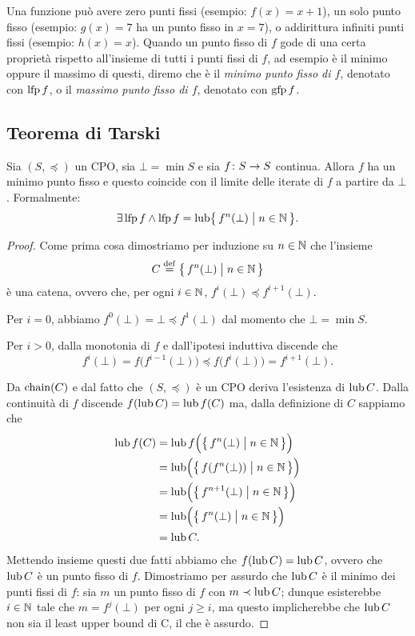 Una funzione può avere zero punti fissi (esempio: $f(x) = x+1$),
un solo punto fisso
(esempio: $g(x) = 7$ ha un punto fisso in $x=7$),
o addirittura infiniti punti fissi (esempio: $h(x) = x$).
Quando un punto fisso di $f$ gode di una certa proprietà rispetto
all'insieme di tutti i punti fissi di $f$, ad esempio è il minimo
oppure il massimo di questi, diremo che è il
\emph{minimo punto fisso di $f$}, denotato con $\mathop{\mathrm{lfp}}\nolimits f$,
o il \emph{massimo punto fisso di $f$}, denotato con $\mathop{\mathrm{gfp}}\nolimits f$.

\subsection{Teorema di Tarski}
\label{sec:Tarski}

\begin{teorema} 
Sia $(S, \preceq)$ un CPO, sia $\bot = \min S$ e sia
$\mathord{f}\colon S\to S$ continua.
Allora $f$ ha un minimo punto fisso e questo coincide con il limite
delle iterate di $f$ a partire da $\bot$.
Formalmente:
\[
  \exists \mathop{\mathrm{lfp}}\nolimits f
    \land
      \mathop{\mathrm{lfp}}\nolimits f = \mathop{\mathrm{lub}}\nolimits \bigl\{\, f^n(\bot) \bigm| n \in \mathbb{N} \,\bigr\}.
\]
\begin{proof}
Come prima cosa dimostriamo per induzione su $n \in \mathbb{N}$
che l'insieme
\[
  C \defeq \bigl\{\, f^n(\bot) \bigm| n \in \Nset \,\bigr\}
\]
è una catena, ovvero che, per ogni $i \in \mathbb{N}$,
$f^i(\bot) \preceq f^{i+1}(\bot)$.

Per $i = 0$, abbiamo $f^0(\bot) = \bot \preceq f^1(\bot)$
dal momento che $\bot = \min S$.

Per $i > 0$, dalla monotonia di $f$ e dall'ipotesi induttiva discende che
\[
  f^i(\bot) = f\bigl(f^{i-1}(\bot)\bigr)
            \preceq f\bigl(f^i(\bot)\bigr)
            = f^{i+1}(\bot).
\]

Da $\mathop{\mathrm{chain}}\nolimits(C)$ e dal fatto che $(S, \preceq)$ è un CPO deriva l'esistenza
di $\mathop{\mathrm{lub}}\nolimits C$.
Dalla continuità di $f$ discende $f(\mathop{\mathrm{lub}}\nolimits C) = \mathop{\mathrm{lub}}\nolimits f(C)$ ma,
dalla definizione di $C$ sappiamo che
\begin{align*}
  \mathop{\mathrm{lub}}\nolimits f(C)
    &= \mathop{\mathrm{lub}}\nolimits f\Bigl(\bigl\{\, f^n(\bot) \bigm| n \in \mathbb{N} \,\bigr\}\Bigr) \\
    &= \mathop{\mathrm{lub}}\nolimits \Bigl(\bigl\{\, f(f^n(\bot)) \bigm| n \in \mathbb{N} \,\bigr\}\Bigr) \\
    &= \mathop{\mathrm{lub}}\nolimits \Bigl(\bigl\{\, f^{n+1}(\bot) \bigm| n \in \mathbb{N} \,\bigr\}\Bigr) \\
    &= \mathop{\mathrm{lub}}\nolimits \Bigl(\bigl\{\, f^n(\bot) \bigm| n \in \mathbb{N} \,\bigr\}\Bigr) \\
    &= \mathop{\mathrm{lub}}\nolimits C.
\end{align*}
Mettendo insieme questi due fatti abbiamo che $f(\mathop{\mathrm{lub}}\nolimits C) = \mathop{\mathrm{lub}}\nolimits C$,
ovvero che $\mathop{\mathrm{lub}}\nolimits C$ è un punto fisso di $f$.
Dimostriamo per assurdo che $\mathop{\mathrm{lub}}\nolimits C$ è il minimo dei punti fissi di $f$:
sia $m$ un punto fisso di $f$ con $m \prec \mathop{\mathrm{lub}}\nolimits C$;
dunque esisterebbe $i \in \mathbb{N}$ tale che $m = f^j(\bot)$ per ogni $j \geq i$,
ma questo implicherebbe che $\mathop{\mathrm{lub}}\nolimits C$ non sia il least upper bound di C,
il che è assurdo.
  \end{proof}
\end{teorema}
